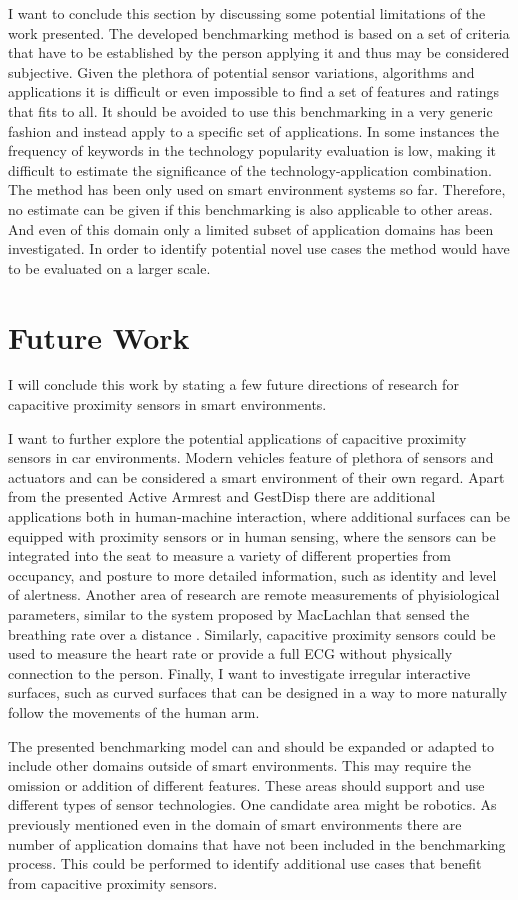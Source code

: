 I want to conclude this section by discussing some potential limitations of the work presented. The developed benchmarking method is based on a set of criteria that have to be established by the person applying it and thus may be considered subjective. Given the plethora of potential sensor variations, algorithms and applications it is difficult or even impossible to find a set of features and ratings that fits to all. It should be avoided to use this benchmarking in a very generic fashion and instead apply to a specific set of applications. In some instances the frequency of keywords in the technology popularity evaluation is low, making it difficult to estimate the significance of the technology-application combination. The method has been only used on smart environment systems so far. Therefore, no estimate can be given if this benchmarking is also applicable to other areas. And even of this domain only a limited subset of application domains has been investigated. In order to identify potential novel use cases the method would have to be evaluated on a larger scale.

\section{Future Work}
I will conclude this work by stating a few future directions of research for capacitive proximity sensors in smart environments.

I want to further explore the potential applications of capacitive proximity sensors in car environments. Modern vehicles feature of plethora of sensors and actuators and can be considered a smart environment of their own regard. Apart from the presented Active Armrest and GestDisp there are additional applications both in human-machine interaction, where additional surfaces can be equipped with proximity sensors or in human sensing, where the sensors can be integrated into the seat to measure a variety of different properties from occupancy, and posture to more detailed information, such as identity and level of alertness. Another area of research are remote measurements of phyisiological parameters, similar to the system proposed by MacLachlan that sensed the breathing rate over a distance \cite{MacLachlan2004}. Similarly, capacitive proximity sensors could be used to measure the heart rate or provide a full ECG without physically connection to the person. Finally, I want to investigate irregular interactive surfaces, such as curved surfaces that can be designed in a way to more naturally follow the movements of the human arm.

The presented benchmarking model can and should be expanded or adapted to include other domains outside of smart environments. This may require the omission or addition of different features. These areas should support and use different types of sensor technologies. One candidate area might be robotics. As previously mentioned even in the domain of smart environments there are number of application domains that have not been included in the benchmarking process. This could be performed to identify additional use cases that benefit from capacitive proximity sensors.



